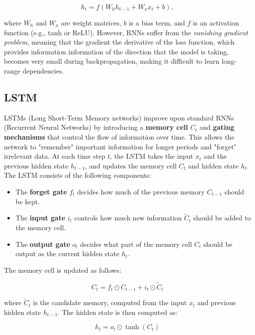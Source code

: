 \begin{equation}
    h_t = f(W_h h_{t-1} + W_x x_t + b),
\end{equation}

where \( W_h \) and \( W_x \) are weight matrices, \( b \) is a bias term, and \( f \) is an activation function (e.g., tanh or ReLU). However, RNNs suffer from the \textit{vanishing gradient problem}, meaning that the gradient the derivative of the loss function, which provides information information of the direction that the model is taking, becomes very small during backpropagation, making it difficult to learn long-range dependencies.
\subsection{LSTM}
LSTMs (Long Short-Term Memory networks) improve upon standard RNNs (Recurrent Neural Networks) by introducing a \textbf{memory cell} \( C_t \) and \textbf{gating mechanisms} that control the flow of information over time. This allows the network to "remember" important information for longer periods and "forget" irrelevant data.
At each time step \( t \), the LSTM takes the input \( x_t \) and the previous hidden state \( h_{t-1} \), and updates the memory cell \( C_t \) and hidden state \( h_t \). The LSTM consists of the following components:

\begin{itemize}
    \item The \textbf{forget gate} \( f_t \) decides how much of the previous memory \( C_{t-1} \) should be kept.
    \item The \textbf{input gate} \( i_t \) controls how much new information \( \tilde{C}_t \) should be added to the memory cell.
    \item The \textbf{output gate} \( o_t \) decides what part of the memory cell \( C_t \) should be output as the current hidden state \( h_t \).
\end{itemize}

The memory cell is updated as follows:

\[
C_t = f_t \odot C_{t-1} + i_t \odot \tilde{C}_t
\]

where \( \tilde{C}_t \) is the candidate memory, computed from the input \( x_t \) and previous hidden state \( h_{t-1} \). The hidden state is then computed as:

\[
h_t = o_t \odot \tanh(C_t)
\]
